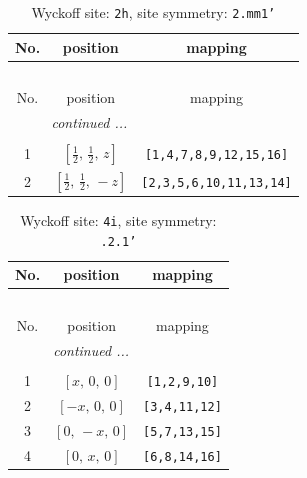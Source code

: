 \documentclass[fleqn,8pt]{jsarticle}
\begin{document}
\begin{longtable}{ccc}
\caption{Wyckoff site: {\tt 2h}, site symmetry: {\tt 2.mm1'}}
 \\
 \hline \hline
No. & position & mapping \\ \hline \endfirsthead

\multicolumn{2}{l}{\tablename\ \thetable{}} \\
 \hline \hline
No. & position & mapping \\ \hline \endhead

 \hline \hline
\multicolumn{2}{r}{\footnotesize\it continued ...} \\ \endfoot

 \hline \hline
\multicolumn{2}{r}{} \\ \endlastfoot

1 & $\left[ \frac{1}{2},\, \frac{1}{2},\, z \right]$ & {\tt [1,4,7,8,9,12,15,16]} \\ \hline
2 & $\left[ \frac{1}{2},\, \frac{1}{2},\, - z \right]$ & {\tt [2,3,5,6,10,11,13,14]} \\
\end{longtable}
\renewcommand{\arraystretch}{1.2}
\begin{longtable}{ccc}
\caption{Wyckoff site: {\tt 4i}, site symmetry: {\tt .2.1'}}
 \\
 \hline \hline
No. & position & mapping \\ \hline \endfirsthead

\multicolumn{2}{l}{\tablename\ \thetable{}} \\
 \hline \hline
No. & position & mapping \\ \hline \endhead

 \hline \hline
\multicolumn{2}{r}{\footnotesize\it continued ...} \\ \endfoot

 \hline \hline
\multicolumn{2}{r}{} \\ \endlastfoot

1 & $\left[ x,\, 0,\, 0 \right]$ & {\tt [1,2,9,10]} \\ \hline
2 & $\left[ - x,\, 0,\, 0 \right]$ & {\tt [3,4,11,12]} \\ \hline
3 & $\left[ 0,\, - x,\, 0 \right]$ & {\tt [5,7,13,15]} \\ \hline
4 & $\left[ 0,\, x,\, 0 \right]$ & {\tt [6,8,14,16]} \\
\end{longtable}
\renewcommand{\arraystretch}{1.2}
\end{document}
